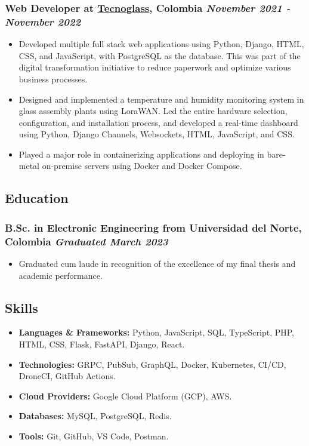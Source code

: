 \documentclass[a4paper,10pt]{article}
\begin{document}
\subsubsection*{%
  \textbf{Web Developer} at \href{https://www.tecnoglass.com/en/}{Tecnoglass}, Colombia
  \hfill
  \textit{November 2021 - November 2022}
}
\begin{itemize}
  \item Developed multiple full stack web applications using Python, Django, HTML, CSS, and JavaScript, with PostgreSQL as the database.
    This was part of the digital transformation initiative to reduce paperwork and optimize various business processes.
  \item Designed and implemented a temperature and humidity monitoring system in glass assembly plants using LoraWAN.
    Led the entire hardware selection, configuration, and installation process, and developed a real-time
    dashboard using Python, Django Channels, Websockets, HTML, JavaScript, and CSS.
  \item Played a major role in containerizing applications and deploying in bare-metal on-premise servers using Docker and Docker Compose.
\end{itemize}

\subsection*{Education}
\subsubsection*{\textbf{B.Sc. in Electronic Engineering} from Universidad del Norte, Colombia \hfill \textit{Graduated March 2023}}
\begin{itemize}
  \item Graduated cum laude in recognition of the excellence of my final thesis and academic performance.
\end{itemize}

\subsection*{Skills}
\begin{itemize}
  \item \textbf{Languages \& Frameworks:} Python, JavaScript, SQL, TypeScript, PHP, HTML, CSS, Flask, FastAPI, Django, React.
  \item \textbf{Technologies:} GRPC, PubSub, GraphQL, Docker, Kubernetes, CI/CD, DroneCI, GitHub Actions.
  \item \textbf{Cloud Providers:} Google Cloud Platform (GCP), AWS.
  \item \textbf{Databases:} MySQL, PostgreSQL, Redis.
  \item \textbf{Tools:} Git, GitHub, VS Code, Postman.
\end{itemize}

\end{document}
